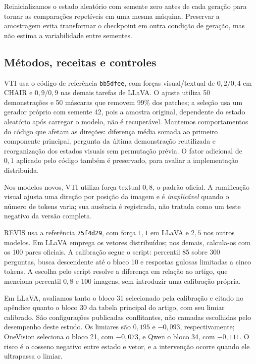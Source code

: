 Reinicializamos o estado aleatório com semente zero antes de cada geração para tornar as comparações repetíveis em uma mesma máquina. Preservar a amostragem evita transformar o checkpoint em outra condição de geração, mas não estima a variabilidade entre sementes.

\subsection{Métodos, receitas e controles}
VTI usa o código de referência \texttt{bb5dfee}, com forças visual/textual de $0{,}2/0{,}4$ em CHAIR e $0{,}9/0{,}9$ nas demais tarefas de LLaVA. O ajuste utiliza 50 demonstrações e 50 máscaras que removem 99\% dos patches; a seleção usa um gerador próprio com semente 42, pois a amostra original, dependente do estado aleatório após carregar o modelo, não é recuperável. Mantemos comportamentos do código que afetam as direções: diferença média somada ao primeiro componente principal, pergunta da última demonstração reutilizada e reorganização dos estados visuais sem permutação prévia. O fator adicional de $0{,}1$ aplicado pelo código também é preservado, para avaliar a implementação distribuída.

Nos modelos novos, VTI utiliza força textual $0{,}8$, o padrão oficial. A ramificação visual ajusta uma direção por posição da imagem e é \emph{inaplicável} quando o número de tokens varia; sua ausência é registrada, não tratada como um teste negativo da versão completa.

REVIS usa a referência \texttt{75f4d29}, com força $1{,}1$ em LLaVA e $2{,}5$ nos outros modelos. Em LLaVA emprega os vetores distribuídos; nos demais, calcula-os com os 100 pares oficiais. A calibração segue o script: percentil 85 sobre 300 perguntas, busca descendente até o bloco 10 e respostas gulosas limitadas a cinco tokens. A escolha pelo script resolve a diferença em relação ao artigo, que menciona percentil $0{,}8$ e 100 imagens, sem introduzir uma calibração própria.

Em LLaVA, avaliamos tanto o bloco 31 selecionado pela calibração e citado no apêndice quanto o bloco 30 da tabela principal do artigo, com seu limiar calibrado. São configurações publicadas conflitantes, não camadas escolhidas pelo desempenho deste estudo. Os limiares são $0{,}195$ e $-0{,}093$, respectivamente; OneVision seleciona o bloco 21, com $-0{,}073$, e Qwen o bloco 34, com $-0{,}111$. O risco é o cosseno negativo entre estado e vetor, e a intervenção ocorre quando ele ultrapassa o limiar.


